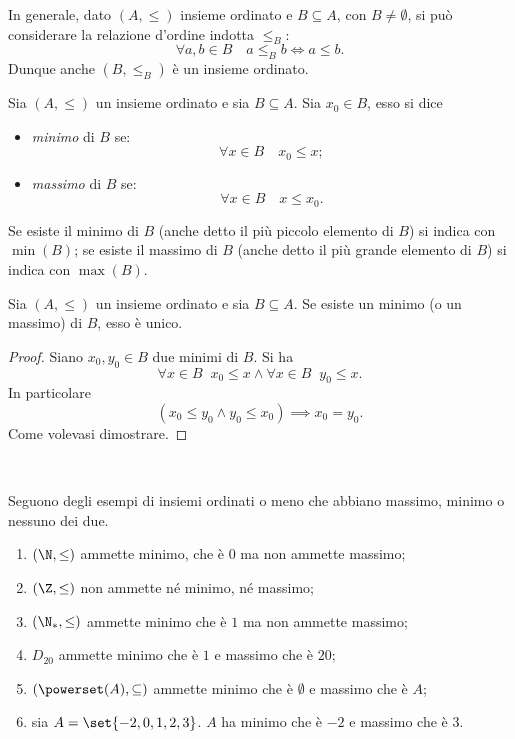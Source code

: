 In generale, dato \((A, \leq)\) insieme ordinato e \(B \subseteq A\), con \(B \neq \emptyset\), si può considerare la relazione d'ordine indotta \(\leq_B\):
\[
    \forall a,b \in B \quad a \leq_B b \iff a \leq b.
\]
Dunque anche \((B, \leq_B)\) è un insieme ordinato.


\begin{definition}\label{def:minimo_massimo}
    Sia \((A, \leq)\) un insieme ordinato e sia \(B \subseteq A\). Sia \(x_0 \in B\), esso si dice
    \begin{itemize}
        \item \emph{minimo} di \(B\) se:
            \[
                \forall x \in B \quad x_0 \leq x;
            \]
        \item \emph{massimo} di \(B\) se:
            \[
                \forall x \in B \quad x \leq x_0.
            \]
    \end{itemize}
    Se esiste il minimo di \(B\) (anche detto il più piccolo elemento di \(B\)) si indica con \(\min{(B)}\); se esiste il massimo di \(B\) (anche detto il più grande elemento di \(B\)) si indica con \(\max{(B)}\).
\end{definition}


\begin{proposition}\label{prop:unicità_massimo_minimo}
    Sia \((A, \leq)\) un insieme ordinato e sia \(B \subseteq A\). Se esiste un minimo (o un massimo) di \(B\), esso è unico.
\end{proposition}

\begin{proof}
    Siano \(x_0, y_0 \in B\) due minimi di \(B\). Si ha
    \[
        \forall x \in B \;\; x_0 \leq x
        \land
        \forall x \in B \;\; y_0 \leq x.
    \]
    In particolare
    \[
        (x_0 \leq y_0 \land y_0 \leq x_0) \implies x_0 = y_0.
    \]
    Come volevasi dimostrare.
\end{proof}\\

\begin{examples}
    Seguono degli esempi di insiemi ordinati o meno che abbiano massimo, minimo o nessuno dei due.
    \begin{enumerate}
        \item \((\N, \leq)\) ammette minimo, che è \(0\) ma non ammette massimo;
        \item \((\Z, \leq)\) non ammette né minimo, né massimo;
        \item \((\N_*, \leq)\) ammette minimo che è \(1\) ma non ammette massimo;
        \item \(D_{20}\) ammette minimo che è \(1\) e massimo che è \(20\);
        \item \((\powerset(A), \subseteq)\) ammette minimo che è \(\emptyset\) e massimo che è \(A\);
        \item sia \(A = \set{-2, 0, 1, 2, 3}\). \(A\) ha minimo che è \(-2\) e massimo che è \(3\).
    \end{enumerate}
\end{examples}


